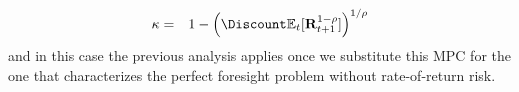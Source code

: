 \begin{eqnarray}
  \MPC & = & 1- \left(\Discount  \Ex_{t}[\Risky_{t+1}^{1-\CRRA}]\right)^{1/\CRRA} \label{eq:MPCExact}
\end{eqnarray}
and in this case the previous analysis applies once we substitute this MPC for the one that characterizes
the perfect foresight problem without rate-of-return risk.
